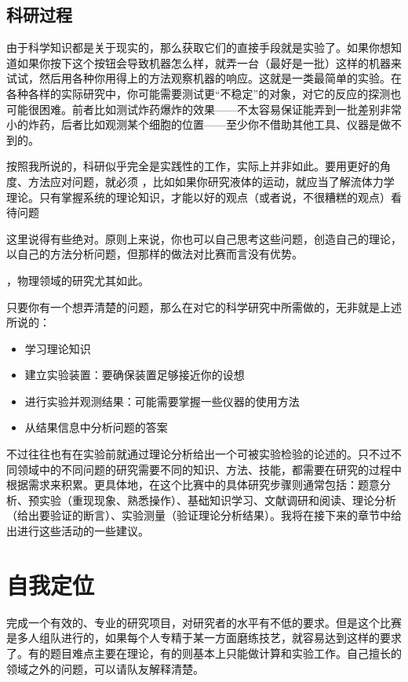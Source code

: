 \documentclass[a4paper,10pt,english]{sphinxmanual}
\begin{document}
\section{科研过程}
\label{\detokenize{3. Intro_Research:id4}}
由于科学知识都是关于现实的，那么获取它们的直接手段就是实验了。如果你想知道如果你按下这个按钮会导致机器怎么样，就弄一台（最好是一批）这样的机器来试试，然后用各种你用得上的方法观察机器的响应。这就是一类最简单的实验。在各种各样的实际研究中，你可能需要测试更“不稳定”的对象，对它的反应的探测也可能很困难。前者比如测试炸药爆炸的效果——不太容易保证能弄到一批差别非常小的炸药，后者比如观测某个细胞的位置——至少你不借助其他工具、仪器是做不到的。

按照我所说的，科研似乎完全是实践性的工作，实际上并非如此。要用更好的角度、方法应对问题，就必须  ，比如如果你研究液体的运动，就应当了解流体力学理论。只有掌握系统的理论知识，才能以好的观点（或者说，不很糟糕的观点）看待问题 %
\begin{footnote}[2]\sphinxAtStartFootnote
这里说得有些绝对。原则上来说，你也可以自己思考这些问题，创造自己的理论，以自己的方法分析问题，但那样的做法对比赛而言没有优势。
%
\end{footnote} ，物理领域的研究尤其如此。

只要你有一个想弄清楚的问题，那么在对它的科学研究中所需做的，无非就是上述所说的：
\begin{itemize}
\item {} 
学习理论知识

\item {} 
建立实验装置：要确保装置足够接近你的设想

\item {} 
进行实验并观测结果：可能需要掌握一些仪器的使用方法

\item {} 
从结果信息中分析问题的答案

\end{itemize}

不过往往也有在实验前就通过理论分析给出一个可被实验检验的论述的。只不过不同领域中的不同问题的研究需要不同的知识、方法、技能，都需要在研究的过程中根据需求来积累。更具体地，在这个比赛中的具体研究步骤则通常包括：题意分析、预实验（重现现象、熟悉操作）、基础知识学习、文献调研和阅读、理论分析（给出要验证的断言）、实验测量（验证理论分析结果）。我将在接下来的章节中给出进行这些活动的一些建议。


\chapter{自我定位}
\label{\detokenize{4. ChooseYourSkill:id1}}\label{\detokenize{4. ChooseYourSkill::doc}}
完成一个有效的、专业的研究项目，对研究者的水平有不低的要求。但是这个比赛是多人组队进行的，如果每个人专精于某一方面磨练技艺，就容易达到这样的要求了。有的题目难点主要在理论，有的则基本上只能做计算和实验工作。自己擅长的领域之外的问题，可以请队友解释清楚。
\end{document}
